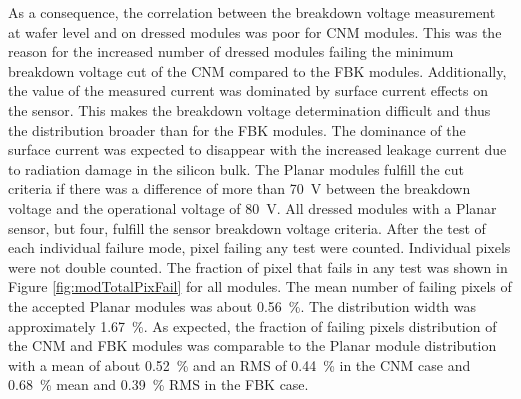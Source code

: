 As a consequence, the correlation between the breakdown voltage measurement at wafer level and on dressed modules was poor for CNM modules. This was the reason for the increased number of dressed modules failing the minimum breakdown voltage cut of the CNM compared to the FBK modules. Additionally, the value of the measured current was dominated by surface current effects on the sensor. This makes the breakdown voltage determination difficult and thus the distribution broader than for the FBK modules. The dominance of the surface current was expected to disappear with the increased leakage current due to radiation damage in the silicon bulk.
The Planar  modules fulfill the cut criteria if there was a difference of more than \SI{70}{\volt} between the breakdown voltage and the operational voltage of \SI{80}{\volt}. All dressed modules with a Planar  sensor, but four, fulfill the sensor breakdown voltage criteria.
After the test of each individual failure mode, pixel failing any test were counted. Individual pixels were not double counted. %
The fraction of pixel that fails in any test was shown in Figure \ref{fig:modTotalPixFail} for all modules. The mean number of failing pixels of the accepted Planar  modules was about \SI{0.56}{\percent}. The distribution width was approximately \SI{1.67}{\percent}. As expected, the fraction of failing pixels distribution of the CNM and FBK modules was comparable to the Planar  module distribution with a mean of about \SI{0.52}{\percent} and an RMS of \SI{0.44}{\percent} in the CNM case and \SI{0.68}{\percent} mean and \SI{0.39}{\percent} RMS in the FBK case. 

